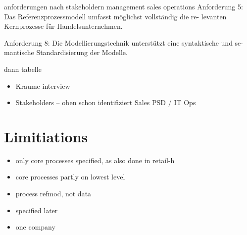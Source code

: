 anforderungen nach stakeholdern
management
sales
operations
Anforderung 5: Das Referenzprozessmodell umfasst möglichst vollständig die re- levanten Kernprozesse für Handelsunternehmen.

Anforderung 8: Die Modellierungstechnik unterstützt eine syntaktische und se- mantische Standardisierung der Modelle.

dann tabelle


\begin{itemize}
	\item Kraume interview
	\item Stakeholders -- oben schon identifiziert
	\subitem Sales
	\subitem PSD / IT
	\subitem Ops
\end{itemize}
\section{Limitiations}
\begin{itemize}
	\item only core processes specified, as also done in retail-h
	\item core processes partly on lowest level
	\item process refmod, not data
	\item specified later
		\item one company
\end{itemize}

